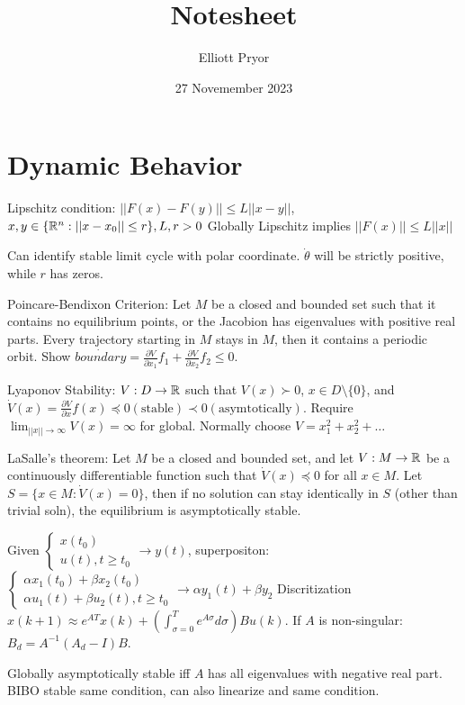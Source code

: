 \documentclass[11pt]{article}
\title{Notesheet}
\author{Elliott Pryor}
\date{27 Novemember 2023}
\begin{document}

\section{Dynamic Behavior}
Lipschitz condition: $||F(x) - F(y)|| \leq L ||x - y||$, $x,y \in \{\mathbb{R}^n: ||x-x_0|| \leq r \}, L,r > 0$
Globally Lipschitz implies $||F(x)|| \leq L ||x||$

Can identify stable limit cycle with polar coordinate. $\dot{\theta}$ will be strictly positive, while $r$ has zeros. 

Poincare-Bendixon Criterion: Let $M$ be a closed and bounded set such that it contains no equilibrium points, or the Jacobion has eigenvalues with positive real parts.
Every trajectory starting in $M$ stays in $M$, then it contains a periodic orbit. Show $\dot{boundary} = \frac{\partial V}{\partial x_1}f_1 + \frac{\partial V}{\partial x_2}f_2 \leq 0$.

Lyaponov Stability: $V: D \to \mathbb{R}$ such that $V(x)\succ 0$, $x \in D \setminus \{0\}$,
and $\dot{V}(x) = \frac{\partial V}{\partial x} f(x) \preceq 0 (\text{stable}) \prec 0 (\text{asymtotically})$.
Require $\lim_{||x|| \to \infty} V(x) = \infty$ for global.
Normally choose $V = x_1^2 + x_2^2 + \dots$

LaSalle's theorem: Let $M$ be a closed and bounded set, and let $V: M \to \mathbb{R}$ be a continuously differentiable function such that $\dot{V}(x) \preceq 0$ for all $x \in M$.
Let $S = \{x \in M: \dot{V}(x) = 0\}$, then if no solution can stay identically in $S$ (other than trivial soln), the equilibrium is asymptotically stable.

Given $\begin{cases}
    x(t_0) \\ u(t), t \geq t_0
\end{cases} \to y(t)$, superpositon: 
$\begin{cases}
    \alpha x_1(t_0) + \beta x_2(t_0) \\ \alpha u_1(t) + \beta u_2(t), t \geq t_0
\end{cases} \to \alpha y_1(t) + \beta y_2$
Discritization $x(k+1) \approx e^{AT}x(k) + (\int_{\sigma = 0} ^T e^{A\sigma}d\sigma) B u(k)$.
If $A$ is non-singular: $B_d = A^{-1}(A_d - I)B$.

Globally asymptotically stable iff $A$ has all eigenvalues with negative real part.
BIBO stable same condition, can also linearize and same condition.
\end{document}
